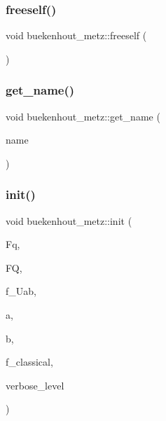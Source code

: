 \mbox{\label{classbuekenhout__metz_a9af576e3e80d9d96934c763b7a5be154}} 
\subsubsection{\texorpdfstring{freeself()}{freeself()}}
{\footnotesize\ttfamily void buekenhout\+\_\+metz\+::freeself (\begin{DoxyParamCaption}{ }\end{DoxyParamCaption})}

\mbox{\label{classbuekenhout__metz_ad9396abddb3685ee0d4159cb7dd4e697}} 
\subsubsection{\texorpdfstring{get\+\_\+name()}{get\_name()}}
{\footnotesize\ttfamily void buekenhout\+\_\+metz\+::get\+\_\+name (\begin{DoxyParamCaption}\item[{\mbox{\hyperlink{galois_8h_ab6cc7b4aeb6ea31aba2b3fbfc83ff5e6}{B\+Y\+TE}} $\ast$}]{name }\end{DoxyParamCaption})}

\mbox{\label{classbuekenhout__metz_a9a784ac5ef293953fbf1c53419c6d02b}} 
\subsubsection{\texorpdfstring{init()}{init()}}
{\footnotesize\ttfamily void buekenhout\+\_\+metz\+::init (\begin{DoxyParamCaption}\item[{\mbox{\hyperlink{classfinite__field}{finite\+\_\+field}} $\ast$}]{Fq,  }\item[{\mbox{\hyperlink{classfinite__field}{finite\+\_\+field}} $\ast$}]{FQ,  }\item[{\mbox{\hyperlink{galois_8h_a09fddde158a3a20bd2dcadb609de11dc}{I\+NT}}}]{f\+\_\+\+Uab,  }\item[{\mbox{\hyperlink{galois_8h_a09fddde158a3a20bd2dcadb609de11dc}{I\+NT}}}]{a,  }\item[{\mbox{\hyperlink{galois_8h_a09fddde158a3a20bd2dcadb609de11dc}{I\+NT}}}]{b,  }\item[{\mbox{\hyperlink{galois_8h_a09fddde158a3a20bd2dcadb609de11dc}{I\+NT}}}]{f\+\_\+classical,  }\item[{\mbox{\hyperlink{galois_8h_a09fddde158a3a20bd2dcadb609de11dc}{I\+NT}}}]{verbose\+\_\+level }\end{DoxyParamCaption})}

